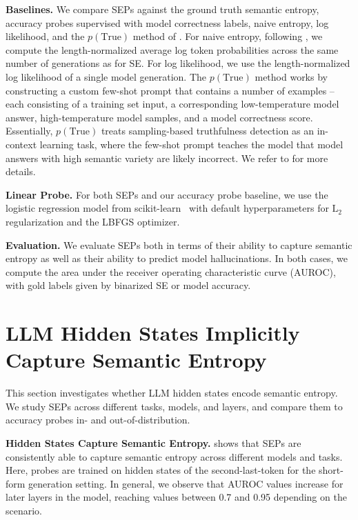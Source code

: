 \documentclass{article}
\begin{document}
\textbf{Baselines.}
We compare SEPs against the ground truth semantic entropy, accuracy probes supervised with model correctness labels, naive entropy, log likelihood, and the $p(\text{True})$ method of \citet{kadavath2022language}.
For naive entropy, following \citet{farquhar2024detecting}, we compute the length-normalized average log token probabilities across the same number of generations as for SE.
For log likelihood, we use the length-normalized log likelihood of a single model generation.
The $p(\text{True})$ method works by constructing a custom few-shot prompt that contains a number of examples -- each consisting of a training set input, a corresponding low-temperature model answer, high-temperature model samples, and a model correctness score.
Essentially, $p(\text{True})$ treats sampling-based truthfulness detection as an in-context learning task, where the few-shot prompt teaches the model that model answers with high semantic variety are likely incorrect.
We refer to \citet{kadavath2022language} for more details.

\textbf{Linear Probe.} 
For both SEPs and our accuracy probe baseline, we use the logistic regression model from scikit-learn~\citep{scikit-learn} with default hyperparameters for $\text{L}_2$ regularization and the LBFGS optimizer.

\textbf{Evaluation.} We evaluate SEPs both in terms of their ability to capture semantic entropy as well as their ability to predict model hallucinations.
In both cases, we compute the area under the receiver operating characteristic curve (AUROC), with gold labels given by binarized SE or model accuracy.


\section{LLM Hidden States Implicitly Capture Semantic Entropy}
\label{subsection:predicting}
This section investigates whether LLM hidden states encode semantic entropy.
We study SEPs across different tasks, models, and layers, and compare them to accuracy probes in- and out-of-distribution.




\textbf{Hidden States Capture Semantic Entropy.}
 shows that SEPs are consistently able to capture semantic entropy across different models and tasks. Here, probes are trained on hidden states of the second-last-token for the short-form generation setting.
In general, we observe that AUROC values increase for later layers in the model, reaching values between \num{0.7} and \num{0.95} depending on the scenario.
\end{document}
